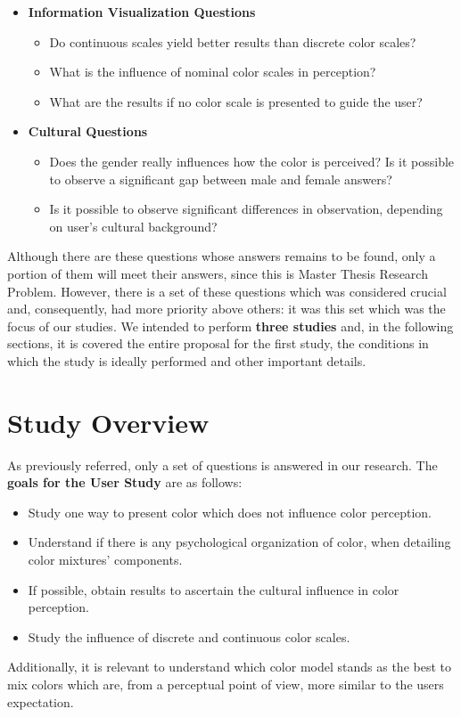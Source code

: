 \begin{itemize}
    \newpage
    \item \textbf{Information Visualization Questions}
    \begin{itemize}
    	\setlength\itemsep{0.1em}
		\item Do continuous scales yield better results than discrete color scales?
        \item What is the influence of nominal color scales in perception?
        \item What are the results if no color scale is presented to guide the user?
	\end{itemize}
    \item \textbf{Cultural Questions}
    \begin{itemize}
    	\setlength\itemsep{0.1em}
		\item Does the gender really influences how the color is perceived? Is it possible to observe a significant gap between male and female answers?
\item Is it possible to observe significant differences in observation, depending on user's cultural background?
	\end{itemize}
\end{itemize} \par
%
Although there are these questions whose answers remains to be found, only a portion of them will meet their answers, since this is Master Thesis Research Problem. However, there is a set of these questions which was considered crucial and, consequently, had more priority above others: it was this set which was the focus of our studies. We intended to perform \textbf{three studies} and, in the following sections, it is covered the entire proposal for the first study, the conditions in which the study is ideally performed and other important details.
%
\section{Study Overview}
\label{sec:studyoverview}
%
As previously referred, only a set of questions is answered in our research. The \textbf{goals for the User Study} are as follows:
%
\begin{itemize}
	\item Study one way to present color which does not influence color perception.
  \item Understand if there is any psychological organization of color, when detailing color mixtures' components.
  \item If possible, obtain results to ascertain the cultural influence in color perception.
  \item Study the influence of discrete and continuous color scales.
\end{itemize}
%
Additionally, it is relevant to understand which color model stands as the best to mix colors which are, from a perceptual point of view, more similar to the users expectation. \par

